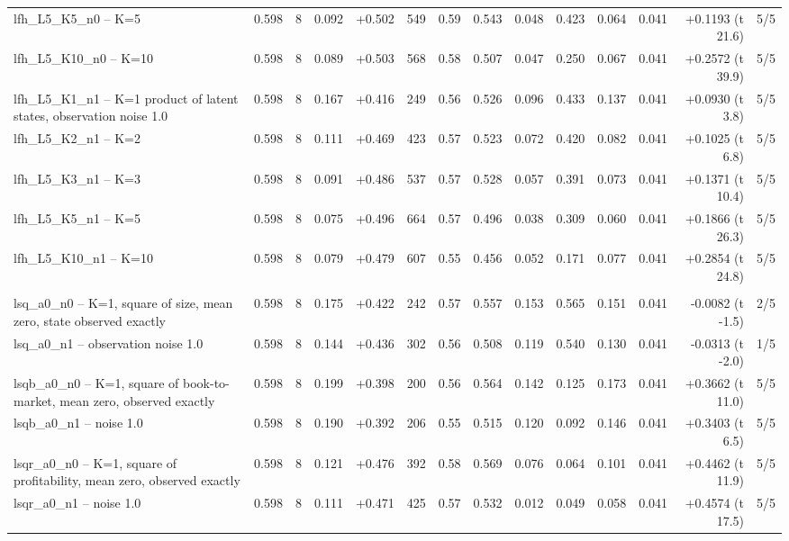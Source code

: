 \begin{table}[htbp]
\begin{adjustbox}{max width=\textwidth}
\begin{tabular}{>{\raggedright\arraybackslash}p{4.6cm}rrrrrrrrrrrrr}
lfh\_L5\_K5\_n0 -- K=5 & 0.598 & 8 & 0.092 & +0.502 & 549 & 0.59 & 0.543 & 0.048 & 0.423 & 0.064 & 0.041 & +0.1193 (t 21.6) & 5/5 \\
lfh\_L5\_K10\_n0 -- K=10 & 0.598 & 8 & 0.089 & +0.503 & 568 & 0.58 & 0.507 & 0.047 & 0.250 & 0.067 & 0.041 & +0.2572 (t 39.9) & 5/5 \\
lfh\_L5\_K1\_n1 -- K=1 product of latent states, observation noise 1.0 & 0.598 & 8 & 0.167 & +0.416 & 249 & 0.56 & 0.526 & 0.096 & 0.433 & 0.137 & 0.041 & +0.0930 (t 3.8) & 5/5 \\
lfh\_L5\_K2\_n1 -- K=2 & 0.598 & 8 & 0.111 & +0.469 & 423 & 0.57 & 0.523 & 0.072 & 0.420 & 0.082 & 0.041 & +0.1025 (t 6.8) & 5/5 \\
lfh\_L5\_K3\_n1 -- K=3 & 0.598 & 8 & 0.091 & +0.486 & 537 & 0.57 & 0.528 & 0.057 & 0.391 & 0.073 & 0.041 & +0.1371 (t 10.4) & 5/5 \\
lfh\_L5\_K5\_n1 -- K=5 & 0.598 & 8 & 0.075 & +0.496 & 664 & 0.57 & 0.496 & 0.038 & 0.309 & 0.060 & 0.041 & +0.1866 (t 26.3) & 5/5 \\
lfh\_L5\_K10\_n1 -- K=10 & 0.598 & 8 & 0.079 & +0.479 & 607 & 0.55 & 0.456 & 0.052 & 0.171 & 0.077 & 0.041 & +0.2854 (t 24.8) & 5/5 \\
\hline
\multicolumn{14}{l}{\textit{Non-monotone exposures: the square of one firm state}} \\
lsq\_a0\_n0 -- K=1, square of size, mean zero, state observed exactly & 0.598 & 8 & 0.175 & +0.422 & 242 & 0.57 & 0.557 & 0.153 & 0.565 & 0.151 & 0.041 & -0.0082 (t -1.5) & 2/5 \\
lsq\_a0\_n1 -- observation noise 1.0 & 0.598 & 8 & 0.144 & +0.436 & 302 & 0.56 & 0.508 & 0.119 & 0.540 & 0.130 & 0.041 & -0.0313 (t -2.0) & 1/5 \\
lsqb\_a0\_n0 -- K=1, square of book-to-market, mean zero, observed exactly & 0.598 & 8 & 0.199 & +0.398 & 200 & 0.56 & 0.564 & 0.142 & 0.125 & 0.173 & 0.041 & +0.3662 (t 11.0) & 5/5 \\
lsqb\_a0\_n1 -- noise 1.0 & 0.598 & 8 & 0.190 & +0.392 & 206 & 0.55 & 0.515 & 0.120 & 0.092 & 0.146 & 0.041 & +0.3403 (t 6.5) & 5/5 \\
lsqr\_a0\_n0 -- K=1, square of profitability, mean zero, observed exactly & 0.598 & 8 & 0.121 & +0.476 & 392 & 0.58 & 0.569 & 0.076 & 0.064 & 0.101 & 0.041 & +0.4462 (t 11.9) & 5/5 \\
lsqr\_a0\_n1 -- noise 1.0 & 0.598 & 8 & 0.111 & +0.471 & 425 & 0.57 & 0.532 & 0.012 & 0.049 & 0.058 & 0.041 & +0.4574 (t 17.5) & 5/5 \\
\hline\end{tabular}\end{adjustbox}\end{table}
